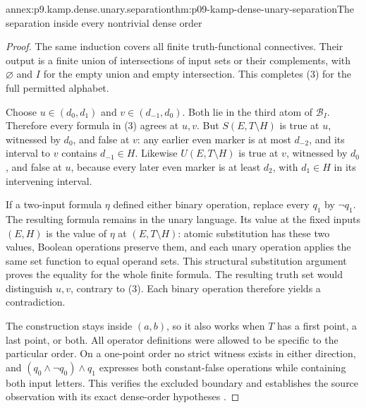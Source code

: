 \begin{annexitem}{annex:p9.kamp.dense.unary.separation}{thm:p09-kamp-dense-unary-separation}{The separation inside every nontrivial dense order}
\begin{proof}
The same induction covers all finite truth-functional
connectives. Their output is a finite union of intersections
of input sets or their complements, with \(\varnothing\)
and \(I\) for the empty union and empty intersection.
This completes (3) for the full permitted alphabet.

Choose \(u\in(d_0,d_1)\) and
\(v\in(d_{-1},d_0)\). Both lie in the third atom of
\(\mathcal B_I\). Therefore every formula in (3) agrees
at \(u,v\). But \(S(E,T\setminus H)\) is true at
\(u\), witnessed by \(d_0\), and false at \(v\):
any earlier even marker is at most \(d_{-2}\), and its
interval to \(v\) contains \(d_{-1}\in H\).
Likewise \(U(E,T\setminus H)\) is true at \(v\),
witnessed by \(d_0\), and false at \(u\), because
every later even marker is at least \(d_2\), with
\(d_1\in H\) in its intervening interval.

If a two-input formula \(\eta\) defined either binary
operation, replace every \(q_1\) by \(\neg q_1\).
The resulting formula remains in the unary language. Its
value at the fixed inputs \((E,H)\) is the value of
\(\eta\) at \((E,T\setminus H)\): atomic substitution
has these two values, Boolean operations preserve them, and
each unary operation applies the same set function to equal
operand sets. This structural substitution argument proves
the equality for the whole finite formula. The resulting
truth set would distinguish \(u,v\), contrary to (3).
Each binary operation therefore yields a contradiction.

The construction stays inside \((a,b)\), so it also works
when \(T\) has a first point, a last point, or both. All
operator definitions were allowed to be specific to the
particular order. On a one-point order no strict witness
exists in either direction, and
\((q_0\land\neg q_0)\land q_1\)
expresses both constant-false operations while containing both
input letters. This verifies the
excluded boundary and establishes the source observation
with its exact dense-order hypotheses
\cite[ch.~IV, pp.~99--100]{Kamp1968}.
\end{proof}
\end{annexitem}

